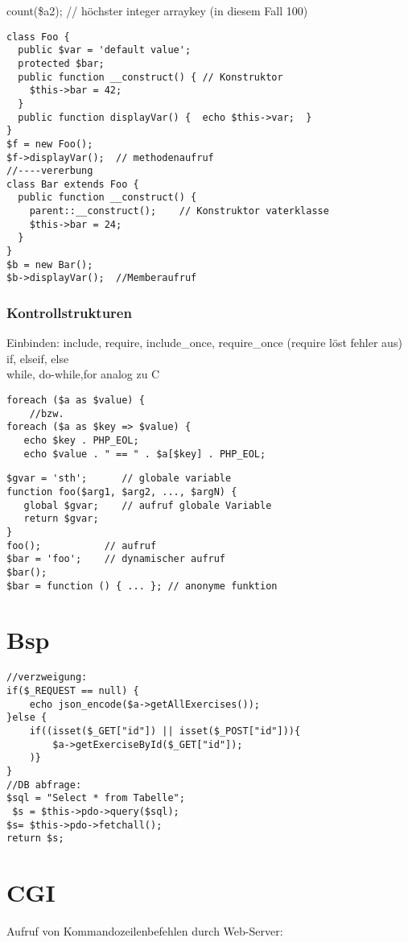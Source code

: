 count(\$a2); // höchster integer arraykey (in diesem Fall 100)
\begin{verbatim}
class Foo {
  public $var = 'default value';
  protected $bar;
  public function __construct() { // Konstruktor
    $this->bar = 42;
  }
  public function displayVar() {  echo $this->var;  }
}
$f = new Foo();
$f->displayVar();  // methodenaufruf
//----vererbung
class Bar extends Foo {
  public function __construct() {
    parent::__construct();    // Konstruktor vaterklasse
    $this->bar = 24;
  }
}
$b = new Bar();
$b->displayVar();  //Memberaufruf
\end{verbatim}\newpage

\subsubsection{Kontrollstrukturen}
Einbinden: include, require, include\_once, require\_once (require löst fehler aus)\\
if, elseif, else\\
while, do-while,for analog zu C
\begin{verbatim}
foreach ($a as $value) {
	//bzw.
foreach ($a as $key => $value) {
   echo $key . PHP_EOL;   
   echo $value . " == " . $a[$key] . PHP_EOL;
\end{verbatim}
\begin{verbatim}
$gvar = 'sth';      // globale variable
function foo($arg1, $arg2, ..., $argN) {
   global $gvar;    // aufruf globale Variable
   return $gvar;
}
foo();           // aufruf
$bar = 'foo';    // dynamischer aufruf
$bar();
$bar = function () { ... }; // anonyme funktion
\end{verbatim} \newpage 

\section{Bsp}
\begin{verbatim}
//verzweigung:
if($_REQUEST == null) {
    echo json_encode($a->getAllExercises());
}else {
    if((isset($_GET["id"]) || isset($_POST["id"])){
        $a->getExerciseById($_GET["id"]);
    )}
}
//DB abfrage:
$sql = "Select * from Tabelle";
 $s = $this->pdo->query($sql);
$s= $this->pdo->fetchall();
return $s;
\end{verbatim}
\newpage
\section{CGI}
Aufruf von Kommandozeilenbefehlen durch Web-Server: 

